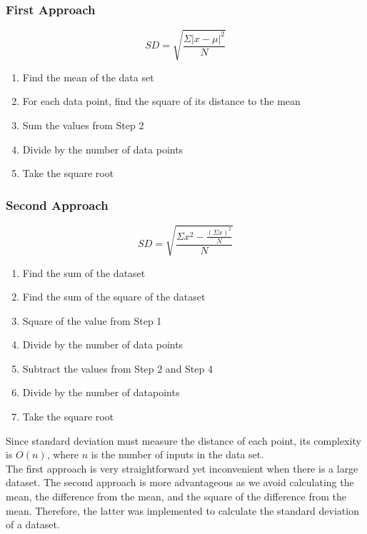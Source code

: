 \documentclass[11pt,onside]{report}
\begin{document}
\subsubsection{First Approach}
\begin{equation}
    SD = \sqrt{\frac{\Sigma |x-\mu|^2}{N}}
\end{equation}
\begin{enumerate}
    \item Find the mean of the data set
    \item For each data point, find the square of its distance to the mean
    \item Sum the values from Step 2
    \item Divide by the number of data points
    \item Take the square root
\end{enumerate}

\subsubsection{Second Approach}
\begin{equation}
    SD = \sqrt{\frac{\Sigma x^2 - \frac{(\Sigma x)^2}{N}}{N}}
\end{equation}
\begin{enumerate}
    \item Find the sum of the dataset
    \item Find the sum of the square of the dataset
    \item Square of the value from Step 1
    \item Divide by the number of data points
    \item Subtract the values from Step 2 and Step 4
    \item Divide by the number of datapoints
    \item Take the square root
\end{enumerate}

Since standard deviation must measure the distance of each point, its complexity is $O(n)$, where $n$ is the number of inputs in the data set. \\

The first approach is very straightforward yet inconvenient when there is a large dataset. The second approach is more advantageous as we avoid calculating the mean, the difference from the mean, and the square of the difference from the mean. Therefore, the latter was implemented to calculate the standard deviation of a dataset. \cite{sd-implementation}
\\
\end{document}
